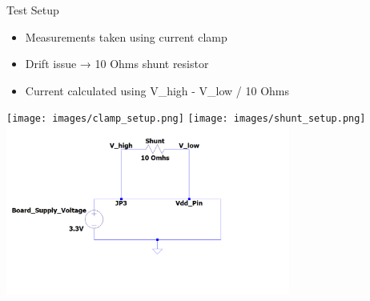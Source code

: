 \begin{frame}{Test Setup}
    \begin{itemize}
        \item Measurements taken using current clamp
        \item Drift issue → 10 Ohms shunt resistor
        \item Current calculated using V\_high - V\_low / 10 Ohms
    \end{itemize}  
    \texttt{[image: images/clamp\_setup.png]}
    \texttt{[image: images/shunt\_setup.png]}
    \includegraphics[height=0.35\textheight,width=0.7\textwidth,keepaspectratio]{images/shunt.png}
\end{frame}

